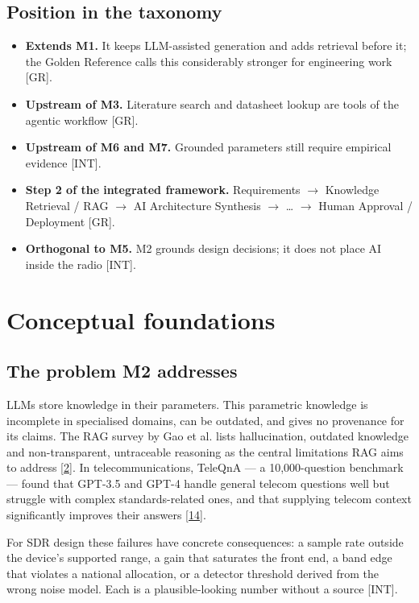 \documentclass[11pt,a4paper]{article}
\newcommand{\prov}[1]{\textsf{\footnotesize[#1]}}
\begin{document}
\subsection{Position in the taxonomy}
\begin{itemize}
\item \textbf{Extends M1.} It keeps LLM-assisted generation and adds retrieval before it; the Golden Reference calls this considerably stronger for engineering work \prov{GR}.
\item \textbf{Upstream of M3.} Literature search and datasheet lookup are tools of the agentic workflow \prov{GR}.
\item \textbf{Upstream of M6 and M7.} Grounded parameters still require empirical evidence \prov{INT}.
\item \textbf{Step 2 of the integrated framework.} Requirements \ensuremath{\rightarrow} Knowledge Retrieval / RAG \ensuremath{\rightarrow} AI Architecture Synthesis \ensuremath{\rightarrow} \ldots{} \ensuremath{\rightarrow} Human Approval / Deployment \prov{GR}.
\item \textbf{Orthogonal to M5.} M2 grounds design decisions; it does not place AI inside the radio \prov{INT}.
\end{itemize}
\section{Conceptual foundations}
\subsection{The problem M2 addresses}
LLMs store knowledge in their parameters. This parametric knowledge is incomplete in specialised domains, can be outdated, and gives no provenance for its claims. The RAG survey by Gao et al. lists hallucination, outdated knowledge and non-transparent, untraceable reasoning as the central limitations RAG aims to address \hyperlink{ref2}{[2]}. In telecommunications, TeleQnA --- a 10,000-question benchmark --- found that GPT-3.5 and GPT-4 handle general telecom questions well but struggle with complex standards-related ones, and that supplying telecom context significantly improves their answers \hyperlink{ref14}{[14]}.

For SDR design these failures have concrete consequences: a sample rate outside the device's supported range, a gain that saturates the front end, a band edge that violates a national allocation, or a detector threshold derived from the wrong noise model. Each is a plausible-looking number without a source \prov{INT}.
\end{document}
